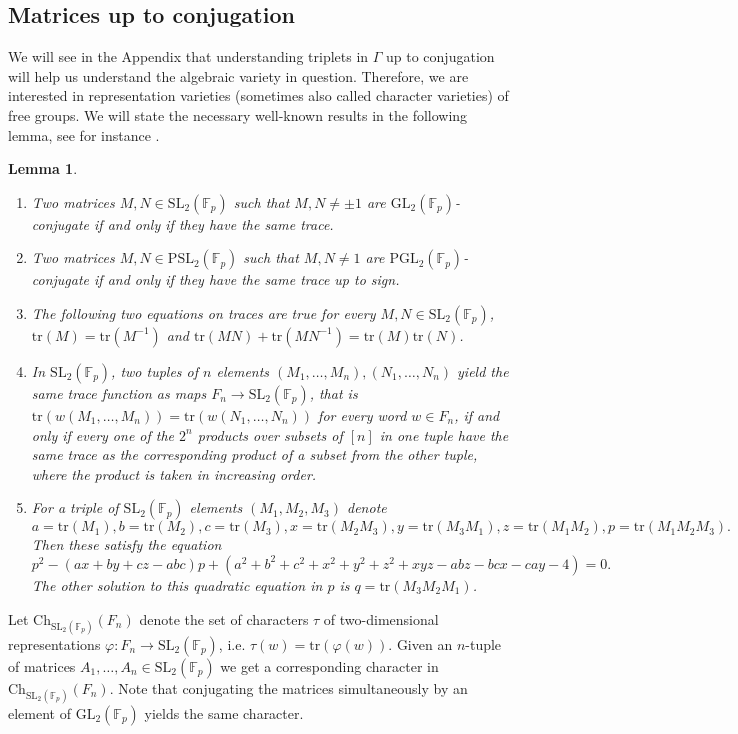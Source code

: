 \documentclass[letterpaper]{amsart}
\newtheorem{lemma}[theorem]{Lemma}
\begin{document}
\subsection{Matrices up to conjugation}
We will see in the Appendix that understanding triplets in $\Gamma$ up to conjugation will help us understand the algebraic variety in question. Therefore, we are interested in representation varieties (sometimes also called character varieties) of free groups. We will state the necessary well-known results in the following lemma, see for instance \cite{magnus1980rings}.
\begin{lemma}
\label{Magnus character varieties}
\begin{enumerate}
    \item Two matrices $ M,N\in\mathrm{SL}_2(\mathbb{F}_p)$ such that $M, N \neq \pm 1$ are $\mathrm{GL}_2(\mathbb{F}_p)$-conjugate if and only if they have the same trace.
    \item Two matrices $M,N\in\mathrm{PSL}_2(\mathbb{F}_p)$ such that $M,N \neq 1$ are $\mathrm{PGL}_2(\mathbb{F}_p)$-conjugate if and only if they have the same trace up to sign.
    \item The following two equations on traces are true for every $M,N\in\mathrm{SL}_2(\mathbb{F}_p)$, $\mathrm{tr}(M)=\mathrm{tr}(M^{-1})$ and $\mathrm{tr}(MN) + \mathrm{tr}(MN^{-1}) = \mathrm{tr}(M)\mathrm{tr}(N)$.
    \item In $\mathrm{SL}_2(\mathbb{F}_p)$, two tuples of $n$ elements $(M_1,\dots,M_n),(N_1,\dots,N_n)$ yield the same trace function as maps $F_n \to \mathrm{SL}_2(\mathbb{F}_p)$, that is $\mathrm{tr}(w(M_1,\dots,M_n))=\mathrm{tr}(w(N_1,\dots,N_n))$ for every word $w\in F_n$, if and only if every one of the $2^n$ products over subsets of $[n]$ in one tuple have the same trace as the corresponding product of a subset from the other tuple, where the product is taken in increasing order.
    \item For a triple of $\mathrm{SL}_2(\mathbb{F}_p)$ elements $(M_1,M_2,M_3)$ denote
    $$a=\mathrm{tr}(M_1),b=\mathrm{tr}(M_2),c=\mathrm{tr}(M_3),x=\mathrm{tr}(M_2M_3),y=\mathrm{tr}(M_3M_1),z=\mathrm{tr}(M_1M_2),p=\mathrm{tr}(M_1M_2M_3).$$
    Then these satisfy the equation
    $$p^2 - (ax+by+cz - abc)p + (a^2 + b^2 + c^2 + x^2 + y^2 + z^2 + xyz - abz - bcx - cay - 4) = 0.$$
    The other solution to this quadratic equation in $p$ is $q = \mathrm{tr}(M_3M_2M_1)$.
\end{enumerate}
\end{lemma}
Let $\mathrm{Ch}_{\mathrm{SL}_2(\mathbb{F}_p)}(F_n)$ denote the set of characters $\tau$ of two-dimensional representations $\varphi:F_n\to \mathrm{SL}_2(\mathbb{F}_p)$, i.e. $\tau(w) = \mathrm{tr}(\varphi(w))$. Given an $n$-tuple of matrices $A_1,\dots,A_n \in \mathrm{SL}_2(\mathbb{F}_p)$ we get a corresponding character in $\mathrm{Ch}_{\mathrm{SL}_2(\mathbb{F}_p)}(F_n)$. Note that conjugating the matrices simultaneously by an element of $\mathrm{GL}_2(\mathbb{F}_p)$ yields the same character.
\end{document}
